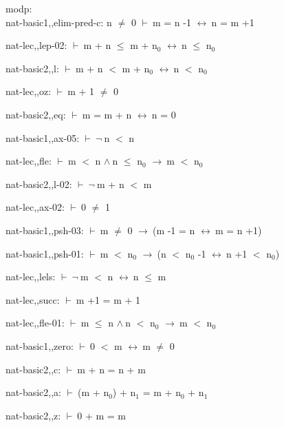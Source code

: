 \documentclass[a4paper]{article}
\newcommand{\Fol}{\mbox{$\vdash\ $}}
\newcommand{\Not}{\mbox{$\neg\ $}}
\newcommand{\And}{\mbox{$\wedge\ $}}
\newcommand{\Imp}{\mbox{$\rightarrow\ $}}
\newcommand{\Equiv}{\mbox{$\leftrightarrow\ $}}
\begin{document}
\bigskip

modp:\\ nat-basic1,,elim-pred-c: 
n $\neq$ 0
 \Fol m = n -1 \Equiv n = m +1



nat-lec,,lep-02: 
 \Fol m + n $\le$ m + $\mbox{n}_{0}$ \Equiv n $\le$ $\mbox{n}_{0}$



nat-basic2,,l: 
 \Fol m + n $<$ m + $\mbox{n}_{0}$ \Equiv n $<$ $\mbox{n}_{0}$



nat-lec,,oz: 
 \Fol m + 1 $\neq$ 0



nat-basic2,,eq: 
 \Fol m = m + n \Equiv n = 0



nat-basic1,,ax-05: 
 \Fol \Not n $<$ n



nat-lec,,fle: 
 \Fol m $<$ n \And n $\le$ $\mbox{n}_{0}$ \Imp m $<$ $\mbox{n}_{0}$



nat-basic2,,l-02: 
 \Fol \Not m + n $<$ m



nat-lec,,ax-02: 
 \Fol 0 $\neq$ 1



nat-basic1,,psh-03: 
 \Fol m $\neq$ 0 \Imp (m -1 = n \Equiv m = n +1)



nat-basic1,,psh-01: 
 \Fol m $<$ $\mbox{n}_{0}$ \Imp (n $<$ $\mbox{n}_{0}$ -1 \Equiv n +1 $<$ $\mbox{n}_{0}$)



nat-lec,,lels: 
 \Fol \Not m $<$ n \Equiv n $\le$ m



nat-lec,,succ: 
 \Fol m +1 = m + 1



nat-lec,,fle-01: 
 \Fol m $\le$ n \And n $<$ $\mbox{n}_{0}$ \Imp m $<$ $\mbox{n}_{0}$



nat-basic1,,zero: 
 \Fol 0 $<$ m \Equiv m $\neq$ 0



nat-basic2,,c: 
 \Fol m + n = n + m



nat-basic2,,a: 
 \Fol (m + $\mbox{n}_{0}$) + $\mbox{n}_{1}$ = m + $\mbox{n}_{0}$ + $\mbox{n}_{1}$



nat-basic2,,z: 
 \Fol 0 + m = m
\end{document}
